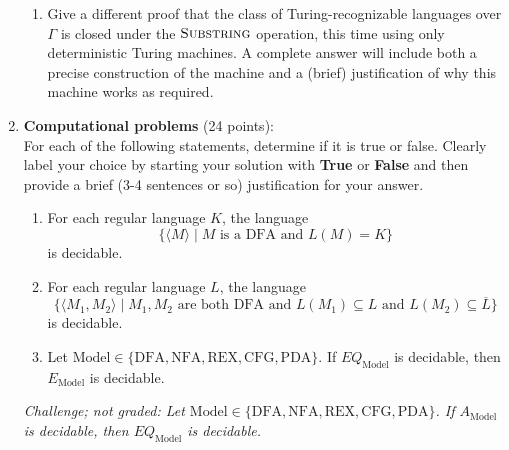 \begin{enumerate}
\begin{enumerate}
    \item\gradeComplete Give a different proof that the class of Turing-recognizable 
    languages over $\Gamma$ is closed 
    under the $\textsc{Substring}$ operation, this time using only deterministic Turing machines.  A complete answer will 
    include both a precise construction of the machine and a 
    (brief) justification of why this machine works as required.

\end{enumerate}


\item \textbf{Computational problems} (24 points): \\
For each of the following statements, determine if it is true or false. 
Clearly label your choice 
by starting your solution with {\bf True} or {\bf False} and then
provide a brief (3-4 sentences or so) justification for your answer.

\begin{enumerate}
\item\gradeCorrect For each regular language $K$, the language 
\[
\{ \langle M \rangle \mid M \text{ is a DFA and } L(M) = K\} 
\]
is decidable.

\item\gradeCorrect For each regular language $L$, the language
\[
\{ \langle M_1, M_2 \rangle \mid M_1, M_2\text{ are both DFA and } 
L(M_1) \subseteq L \text{ and } L(M_2) \subseteq \overline{L}\}
\]
is decidable.


\item\gradeCorrect Let $\mathrm{Model} \in \{\mathrm{DFA}, \mathrm{NFA}, 
\mathrm{REX}, \mathrm{CFG}, \mathrm{PDA} \}$. If $EQ_{\mathrm{Model}}$ is decidable, 
then $E_{\mathrm{Model}}$ is decidable.

\end{enumerate}

{\it Challenge; not graded: Let $\mathrm{Model} \in \{\mathrm{DFA}, \mathrm{NFA}, 
\mathrm{REX}, \mathrm{CFG}, \mathrm{PDA} \}$. If $A_{\mathrm{Model}}$ is decidable, 
then $EQ_{\mathrm{Model}}$ is decidable.}

\end{enumerate}

